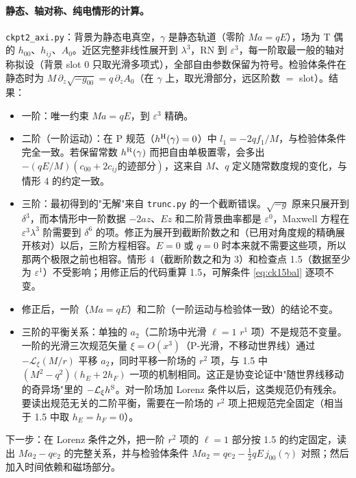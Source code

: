 \documentclass[11pt,a4paper]{ctexart}
\numberwithin{equation}{section}
\begin{document}
\paragraph{静态、轴对称、纯电情形的计算。}\texttt{ckpt2\_axi.py}：背景为静态电真空，$\gamma$ 是静态轨道（零阶 $Ma=qE$），场为 T 偶的 $h_{00}$、$h_{ij}$、$A_0$。近区完整非线性展开到 $\lambda^3$，RN 到 $\varepsilon^3$，每一阶取最一般的轴对称拟设（背景 slot 0 只取光滑多项式），全部自由参数保留为符号。检验体条件在静态时为 $M\,\partial_z\sqrt{-g_{00}}=q\,\partial_zA_0$（在 $\gamma$ 上，取光滑部分，远区阶数 $=$ slot）。结果：
\begin{itemize}
\item 一阶：唯一约束 $Ma=qE$，到 $\varepsilon^3$ 精确。
\item 二阶（一阶运动）：在 P 规范（$h^{\rm H}(\gamma)=0$）中 $l_1=-2qf_1/M$，与检验体条件完全一致。若保留常数 $h^{\rm R}(\gamma)$ 而把自由单极置零，会多出 $-(qE/M)(c_{00}+2c_{ij}\text{的迹部分})$，这来自 $M$、$q$ 定义随常数度规的变化，与情形 4 的约定一致。
\item 三阶：最初得到的"无解"来自 \texttt{trunc.py} 的一个截断错误。$\sqrt{-g}$ 原来只展开到 $\delta^3$，而本情形中一阶数据 $-2az$、$Ez$ 和二阶背景曲率都是 $\varepsilon^0$，Maxwell 方程在 $\varepsilon^3\lambda^3$ 阶需要到 $\delta^6$ 的项。修正为展开到截断阶数之和（已用对角度规的精确展开核对）以后，三阶方程相容。$E=0$ 或 $q=0$ 时本来就不需要这些项，所以那两个极限之前也相容。情形 4（截断阶数之和为 3）和检查点 1.5（数据至少为 $\varepsilon^1$）不受影响；用修正后的代码重算 1.5，可解条件 \eqref{eq:ck15bal} 逐项不变。
\item 修正后，一阶（$Ma=qE$）和二阶（一阶运动与检验体一致）的结论不变。
\item 三阶的平衡关系：单独的 $a_2$（二阶场中光滑 $\ell=1$ $r^1$ 项）不是规范不变量。一阶的光滑三次规范矢量 $\xi=O(x^3)$（P-光滑，不移动世界线）通过 $-\mathcal L_\xi(M/r)$ 平移 $a_2$，同时平移一阶场的 $r^2$ 项，与 1.5 中 $(M^2-q^2)(h_E+2h_F)$ 一项的机制相同。这正是协变论证中"随世界线移动的奇异场"里的 $-\mathcal L_\xi h^{\rm S}$。对一阶场加 Lorenz 条件以后，这类规范仍有残余。要读出规范无关的二阶平衡，需要在一阶场的 $r^2$ 项上把规范完全固定（相当于 1.5 中取 $h_E=h_F=0$）。
\end{itemize}
下一步：在 Lorenz 条件之外，把一阶 $r^2$ 项的 $\ell=1$ 部分按 1.5 的约定固定，读出 $Ma_2-qe_2$ 的完整关系，并与检验体条件 $Ma_2=qe_2-\tfrac12qE\,j_{00}(\gamma)$ 对照；然后加入时间依赖和磁场部分。
\end{document}
